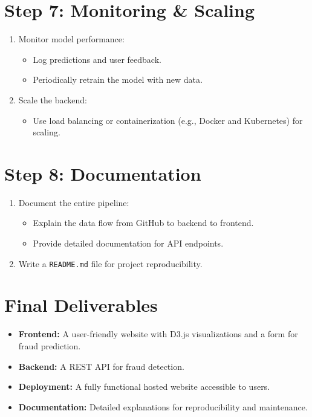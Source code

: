 \documentclass[12pt]{article}
\begin{document}
\section*{Step 7: Monitoring \& Scaling}
\begin{enumerate}
    \item Monitor model performance:
    \begin{itemize}
        \item Log predictions and user feedback.
        \item Periodically retrain the model with new data.
    \end{itemize}
    \item Scale the backend:
    \begin{itemize}
        \item Use load balancing or containerization (e.g., Docker and Kubernetes) for scaling.
    \end{itemize}
\end{enumerate}

\section*{Step 8: Documentation}
\begin{enumerate}
    \item Document the entire pipeline:
    \begin{itemize}
        \item Explain the data flow from GitHub to backend to frontend.
        \item Provide detailed documentation for API endpoints.
    \end{itemize}
    \item Write a \texttt{README.md} file for project reproducibility.
\end{enumerate}

\section*{Final Deliverables}
\begin{itemize}
    \item \textbf{Frontend:} A user-friendly website with D3.js visualizations and a form for fraud prediction.
    \item \textbf{Backend:} A REST API for fraud detection.
    \item \textbf{Deployment:} A fully functional hosted website accessible to users.
    \item \textbf{Documentation:} Detailed explanations for reproducibility and maintenance.
\end{itemize}
\end{document}
